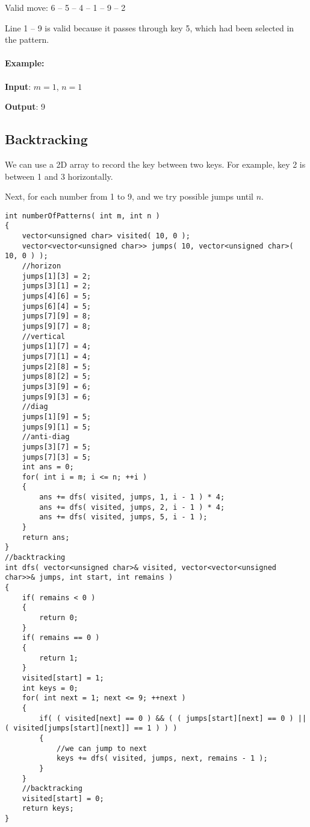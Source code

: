 Valid move: 6 -- 5 -- 4 -- 1 -- 9 -- 2

Line 1 -- 9 is valid because it passes through key 5, which had been selected in the pattern.

\paragraph{Example:}

\begin{flushleft}
\textbf{Input}: $ m = 1 $, $ n = 1 $

\textbf{Output}: 9
\end{flushleft}

\subsection{Backtracking}
We can use a 2D array to record the key between two keys. For example, key 2 is between 1 and 3 horizontally. 

Next, for each number from 1 to 9, and we try possible jumps until $n$.

\setcounter{lstlisting}{0}
\begin{lstlisting}[style=customc, caption={Backtracking}]
int numberOfPatterns( int m, int n )
{
    vector<unsigned char> visited( 10, 0 );
    vector<vector<unsigned char>> jumps( 10, vector<unsigned char>( 10, 0 ) );
    //horizon
    jumps[1][3] = 2;
    jumps[3][1] = 2;
    jumps[4][6] = 5;
    jumps[6][4] = 5;
    jumps[7][9] = 8;
    jumps[9][7] = 8;
    //vertical
    jumps[1][7] = 4;
    jumps[7][1] = 4;
    jumps[2][8] = 5;
    jumps[8][2] = 5;
    jumps[3][9] = 6;
    jumps[9][3] = 6;
    //diag
    jumps[1][9] = 5;
    jumps[9][1] = 5;
    //anti-diag
    jumps[3][7] = 5;
    jumps[7][3] = 5;
    int ans = 0;
    for( int i = m; i <= n; ++i )
    {
        ans += dfs( visited, jumps, 1, i - 1 ) * 4;
        ans += dfs( visited, jumps, 2, i - 1 ) * 4;
        ans += dfs( visited, jumps, 5, i - 1 );
    }
    return ans;
}
//backtracking
int dfs( vector<unsigned char>& visited, vector<vector<unsigned char>>& jumps, int start, int remains )
{
    if( remains < 0 )
    {
        return 0;
    }
    if( remains == 0 )
    {
        return 1;
    }
    visited[start] = 1;
    int keys = 0;
    for( int next = 1; next <= 9; ++next )
    {
        if( ( visited[next] == 0 ) && ( ( jumps[start][next] == 0 ) || ( visited[jumps[start][next]] == 1 ) ) )
        {
            //we can jump to next
            keys += dfs( visited, jumps, next, remains - 1 );
        }
    }
    //backtracking
    visited[start] = 0;
    return keys;
}
\end{lstlisting}